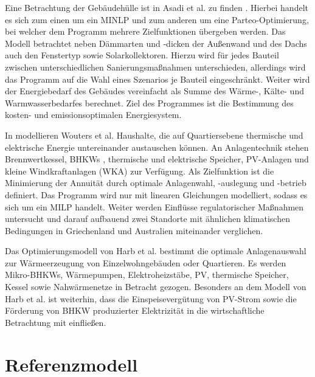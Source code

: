 Eine Betrachtung der Gebäudehülle ist in Asadi et al. zu finden \cite{Asadi.2012}.
Hierbei handelt es sich zum einen um ein MINLP und zum anderen um eine Parteo-Optimierung, bei welcher dem Programm mehrere Zielfunktionen übergeben werden.
Das Modell betrachtet neben Dämmarten und -dicken der Außenwand und des Dachs auch den Fenstertyp sowie Solarkollektoren. 
Hierzu wird für jedes Bauteil zwischen unterschiedlichen Sanierungsmaßnahmen unterschieden, allerdings wird das Programm auf die Wahl eines Szenarios je Bauteil eingeschränkt.
Weiter wird der Energiebedarf des Gebäudes vereinfacht als Summe des Wärme-, Kälte- und Warmwasserbedarfes berechnet.
Ziel des Programmes ist die Bestimmung des kosten- und emissionsoptimalen Energiesystem.

In \cite{Wouters.2014} modellieren Wouters et al. Haushalte, die auf Quartiersebene thermische und elektrische Energie untereinander austauschen können.
An Anlagentechnik stehen Brennwertkessel, BHKWs , thermische und elektrische Speicher, PV-Anlagen und kleine Windkraftanlagen (WKA) zur Verfügung.
Als Zielfunktion ist die Minimierung der Annuität durch optimale Anlagenwahl, -auslegung und -betrieb definiert.
Das Programm wird nur mit linearen Gleichungen modelliert, sodass es sich um ein MILP handelt.
Weiter werden Einflüsse regulatorischer Maßnahmen untersucht und darauf aufbauend zwei Standorte mit ähnlichen klimatischen Bedingungen in Griechenland und Australien miteinander verglichen.

Das Optimierungsmodell von Harb et al. \cite{Harb.2016} bestimmt die optimale Anlagenauswahl zur Wärmeerzeugung von Einzelwohngebäuden oder Quartieren.
Es werden Mikro-BHKWs, Wärmepumpen, Elektroheizstäbe, PV, thermische Speicher, Kessel sowie Nahwärmenetze in Betracht gezogen.
Besonders an dem Modell von Harb et al. ist weiterhin, dass die Einspeisevergütung von PV-Strom sowie die Förderung von BHKW produzierter Elektrizität in die wirtschaftliche Betrachtung mit einfließen.


\section{Referenzmodell}
\label{sec:Sektion 26}

